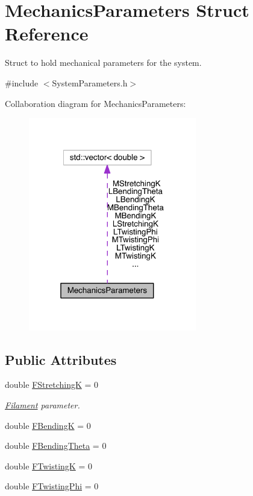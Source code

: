 \hypertarget{structMechanicsParameters}{\section{Mechanics\+Parameters Struct Reference}
\label{structMechanicsParameters}
}


Struct to hold mechanical parameters for the system.  




{\ttfamily \#include $<$System\+Parameters.\+h$>$}



Collaboration diagram for Mechanics\+Parameters\+:\nopagebreak
\begin{figure}[H]
\begin{center}
\leavevmode
\includegraphics[width=208pt]{structMechanicsParameters__coll__graph}
\end{center}
\end{figure}
\subsection*{Public Attributes}
{\bf }\par
\begin{DoxyCompactItemize}
\item 
double \hyperlink{structMechanicsParameters_ab4155933a1fc9e47f67ec6ac71efb1bf}{F\+Stretching\+K} = 0
\begin{DoxyCompactList}\small\item\em \hyperlink{classFilament}{Filament} parameter. \end{DoxyCompactList}\item 
double \hyperlink{structMechanicsParameters_aa13b8fd35ef9f6574981c411b535fb83}{F\+Bending\+K} = 0
\item 
double \hyperlink{structMechanicsParameters_a143107fd6c26d306f4d57e1b006cccb5}{F\+Bending\+Theta} = 0
\item 
double \hyperlink{structMechanicsParameters_af25f0f95ebf55f3f8f02b861bf0a9b2d}{F\+Twisting\+K} = 0
\item 
double \hyperlink{structMechanicsParameters_ae108dda4da55a3debc21abf3fbebd3f3}{F\+Twisting\+Phi} = 0
\end{DoxyCompactItemize}

